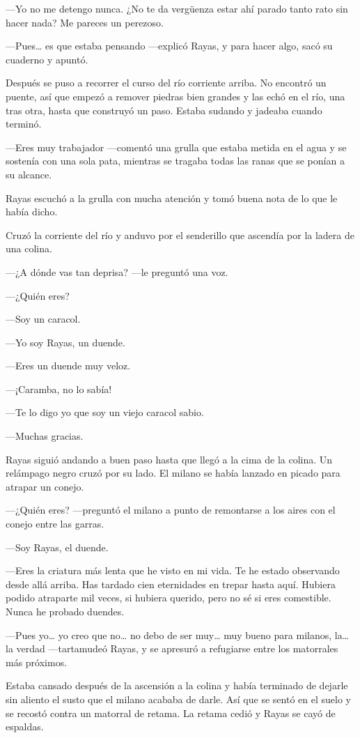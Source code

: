 \documentclass{barcodevapor3pags}
\begin{document}
---Yo no me detengo nunca. ¿No te da vergüenza estar ahí parado tanto
rato sin hacer nada? Me pareces un perezoso.

---Pues\ldots{} es que estaba pensando ---explicó Rayas, y para hacer
algo, sacó su cuaderno y apuntó.

Después se puso a recorrer el curso del río corriente arriba. No
encontró un puente, así que empezó a remover piedras bien grandes y las
echó en el río, una tras otra, hasta que construyó un paso. Estaba
sudando y jadeaba cuando terminó.

---Eres muy trabajador ---comentó una grulla que estaba metida en el
agua y se sostenía con una sola pata, mientras se tragaba todas las
ranas que se ponían a su alcance.

Rayas escuchó a la grulla con mucha atención y tomó buena nota de lo que
le había dicho.

Cruzó la corriente del río y anduvo por el senderillo que ascendía por
la ladera de una colina.

---¿A dónde vas tan deprisa? ---le preguntó una voz.

---¿Quién eres?

---Soy un caracol.

---Yo soy Rayas, un duende.

---Eres un duende muy veloz.

---¡Caramba, no lo sabía!

---Te lo digo yo que soy un viejo caracol sabio.

---Muchas gracias.

Rayas siguió andando a buen paso hasta que llegó a la cima de la colina.
Un relámpago negro cruzó por su lado. El milano se había lanzado en
picado para atrapar un conejo.

---¿Quién eres? ---preguntó el milano a punto de remontarse a los aires
con el conejo entre las garras.

---Soy Rayas, el duende.

---Eres la criatura más lenta que he visto en mi vida. Te he estado
observando desde allá arriba. Has tardado cien eternidades en trepar
hasta aquí. Hubiera podido atraparte mil veces, si hubiera querido, pero
no sé si eres comestible. Nunca he probado duendes.

---Pues yo\ldots{} yo creo que no\ldots{} no debo de ser muy\ldots{} muy
bueno para milanos, la\ldots{} la verdad ---tartamudeó Rayas, y se
apresuró a refugiarse entre los matorrales más próximos.

Estaba cansado después de la ascensión a la colina y había terminado de
dejarle sin aliento el susto que el milano acababa de darle. Así que se
sentó en el suelo y se recostó contra un matorral de retama. La retama
cedió y Rayas se cayó de espaldas.
\end{document}
